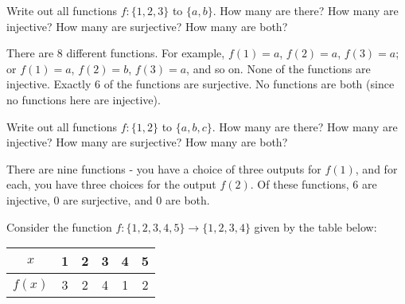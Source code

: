 \begin{questions}
	


\question Write out all functions $f: \{1,2,3\}$ to $\{a,b\}$.  How many are there?  How many are injective?  How many are surjective?  How many are both?

	\begin{answer}
	There are 8 different functions.  For example, $f(1) = a$, $f(2) = a$, $f(3) = a$; or $f(1) = a$, $f(2) = b$, $f(3) = a$, and so on.  None of the functions are injective.  Exactly 6 of the functions are surjective.  No functions are both (since no functions here are injective).
	\end{answer}
	
	
	

\question Write out all functions $f: \{1,2\}$ to $\{a,b,c\}$.  How many are there?  How many are injective?  How many are surjective?  How many are both?

	\begin{answer}
	There are nine functions - you have a choice of three outputs for $f(1)$, and for each, you have three choices for the output $f(2)$.  Of these functions, 6 are injective, 0 are surjective, and 0 are both.
	\end{answer}
	
	
	

\question Consider the function $f:\{1,2,3,4,5\} \to \{1,2,3,4\}$ given by the table below:

\begin{center}
\begin{tabular}{c||c|c|c|c|c}
              $x$ & 1 & 2 & 3 & 4 & 5 \\ \hline
              $f(x)$ & 3 & 2 & 4 & 1 & 2
            \end{tabular}
\end{center}


	\begin{answer}
\end{answer}
\end{questions}
